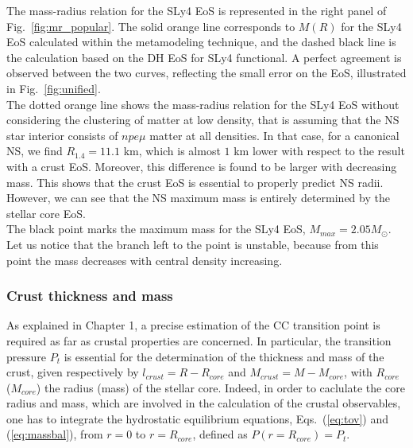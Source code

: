 The mass-radius relation for the SLy4 EoS is represented in the right panel of
Fig.~\ref{fig:mr_popular}. The solid orange line corresponds to $M(R)$ for the 
SLy4 EoS calculated within the metamodeling technique, and the dashed 
black line is the calculation based on the DH EoS for SLy4 functional. A 
perfect agreement is observed between the two curves, reflecting the small 
error on the EoS, illustrated in Fig.~\ref{fig:unified}. \\
The dotted orange line shows the mass-radius relation for the SLy4 EoS without
considering the clustering of matter at low density, that is assuming that the
NS star interior consists of $npe\mu$ matter at all densities. In that case,
for a canonical NS, we find $R_{1.4} = 11.1$ km, which is almost $1$ km lower 
with respect to the result with a crust EoS. Moreover, this difference is found 
to be larger with decreasing mass. This shows that the crust EoS is essential 
to properly predict NS radii. However, we can see that the NS maximum mass is 
entirely determined by the stellar core EoS.\\
The black point marks the maximum mass for the SLy4 EoS, $M_{max} = 
2.05M_\odot$. Let us notice that the branch left to the point is unstable, 
because from this point the mass decreases with central density increasing.

\subsubsection{Crust thickness and mass}
As explained in Chapter 1, a precise estimation of the CC transition point is
required as far as crustal properties are concerned. In particular, the
transition pressure $P_t$ is essential for the determination of the thickness 
and mass of the crust, given respectively by $l_{crust}=R-R_{core}$ and
$M_{crust}=M-M_{core}$, with $R_{core}$ ($M_{core}$) the radius
(mass) of the stellar core. Indeed, in order to caclulate the core radius and
mass, which are involved in the calculation of the crustal observables, one has 
to integrate the hydrostatic equilibrium equations, Eqs.~(\ref{eq:tov}) and 
(\ref{eq:massbal}), from $r=0$ to $r=R_{core}$, defined as $P(r=R_{core})=P_t$.

